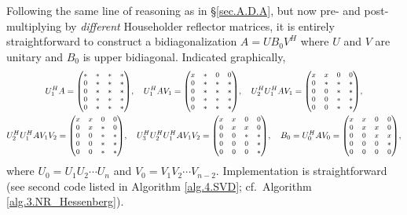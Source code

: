 \noindent Following the same line of reasoning as in \S \ref{sec.A.D.A}, but now pre- and post-multiplying by {\it different} Householder reflector matrices,
it is entirely straightforward to construct a bidiagonalization $A=U B_0 V^H$ where $U$ and $V$ are unitary and $B_0$ is upper bidiagonal.  
Indicated graphically, 
\begin{gather*}
  U^H_1 A = {\footnotesize\begin{pmatrix} * & * & * & * \\ 0 & * & * & * \\ 0 & * & * & * \\ 0 & * & * & * \\ 0 & * & * & * \end{pmatrix}}, \quad
  U^H_1 A V_1 = {\footnotesize\begin{pmatrix} x & * & 0 & 0 \\ 0 & * & * & * \\ 0 & * & * & * \\ 0 & * & * & * \\ 0 & * & * & * \end{pmatrix}}, \quad
  U^H_2 U^H_1 A V_1 = {\footnotesize\begin{pmatrix} x & x & 0 & 0 \\ 0 & * & * & * \\ 0 & 0 & * & * \\ 0 & 0 & * & * \\ 0 & 0 & * & * \end{pmatrix}}, \\
  U^H_2 U^H_1 A V_1 V_2 = {\footnotesize\begin{pmatrix} x & x & 0 & 0 \\ 0 & x & * & 0 \\ 0 & 0 & * & * \\ 0 & 0 & * & * \\ 0 & 0 & * & * \end{pmatrix}}, \quad
  U^H_3 U^H_2 U^H_1 A V_1 V_2 = {\footnotesize\begin{pmatrix} x & x & 0 & 0 \\ 0 & x & x & 0 \\ 0 & 0 & * & * \\ 0 & 0 & 0 & * \\ 0 & 0 & 0 & * \end{pmatrix}}, \quad
  B_0 = U^H_0 A V_0 = {\footnotesize\begin{pmatrix} x & x & 0 & 0 \\ 0 & x & x & 0 \\ 0 & 0 & x & x \\ 0 & 0 & 0 & * \\ 0 & 0 & 0 & 0 \end{pmatrix}},
\end{gather*}
where $U_0=U_1 U_2 \cdots U_n$ and $V_0=V_1 V_2\cdots V_{n-2}$.  Implementation is straightforward (see second code listed in Algorithm \ref{alg.4.SVD}; cf.~Algorithm \ref{alg.3.NR_Hessenberg}).

